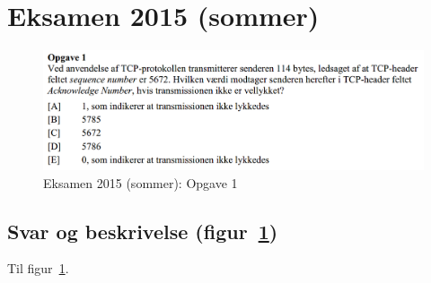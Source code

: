 \newcommand\argang{Eksamen 2015 (sommer)}
\section{\argang}

\begin{figure}[H]
	\centering
	\includegraphics[width=\linewidth]{figs/sommer15/SE15OP1}
	\caption{\argang: Opgave 1}
	\label{fig:SE15OP1}
\end{figure}

\subsection{Svar og beskrivelse (figur~\ref{fig:SE15OP1})}
Til figur~\ref{fig:SE15OP1}. 
\derp

